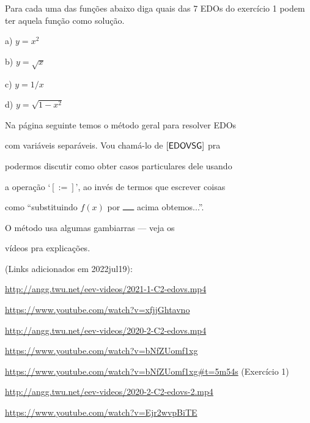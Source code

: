 \documentclass[oneside,12pt]{article}
\begin{document}
Para cada uma das funções abaixo diga quais das 7 EDOs do exercício 1
podem ter aquela função como solução.

\msk

a) $y=x^2$

b) $y=\sqrt{x}$

c) $y=1/x$

d) $y=\sqrt{1-x^2}$



\newpage


Na página seguinte temos o método geral para resolver EDOs

com variáveis separáveis. Vou chamá-lo de $\mathsf{[EDOVSG]}$ pra

podermos discutir como obter casos particulares dele usando

a operação `$[:=]$', ao invés de termos que escrever coisas

como ``substituindo $f(x)$ por $▁▁$ acima obtemos...''.

\ssk

O método  usa algumas gambiarras --- veja os

vídeos pra explicações.

\bsk

{\scriptsize

(Links adicionados em 2022jul19):

\ssk

\url{http://angg.twu.net/eev-videos/2021-1-C2-edovs.mp4}

\url{https://www.youtube.com/watch?v=xfjjGhtavno}

\ssk

\url{http://angg.twu.net/eev-videos/2020-2-C2-edovs.mp4}

\url{https://www.youtube.com/watch?v=bNfZUomf1xg}

\url{https://www.youtube.com/watch?v=bNfZUomf1xg\#t=5m54s} (Exercício 1)

\ssk

\url{http://angg.twu.net/eev-videos/2020-2-C2-edovs-2.mp4}

\url{https://www.youtube.com/watch?v=Ejr2wvpBiTE}


}
\end{document}
